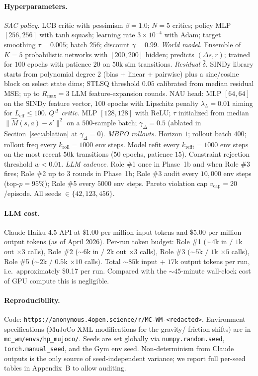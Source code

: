 \documentclass{article}
\theoremstyle{definition}
\newcommand{\QD}{Q^{\Delta}}
\begin{document}
\paragraph{Hyperparameters.}
\emph{SAC policy.}  LCB critic with pessimism $\beta=1.0$; $N=5$ critics;
policy MLP $[256,256]$ with tanh squash; learning rate $3\times 10^{-4}$
with Adam; target smoothing $\tau=0.005$; batch $256$; discount
$\gamma=0.99$.
\emph{World model.}  Ensemble of $K=5$ probabilistic networks with
$[200,200]$ hidden; predicts $(\Delta s, r)$; trained for $100$ epochs
with patience $20$ on $50$k sim transitions.
\emph{Residual $\hat\delta$.}  SINDy library starts from polynomial
degree $2$ (bias + linear + pairwise) plus a sine/cosine block on select
state dims; STLSQ threshold $0.05$ calibrated from median residual MSE;
up to $R_{\max}=3$ LLM feature-expansion rounds.  NAU head: MLP
$[64,64]$ on the SINDy feature vector, $100$ epochs with Lipschitz
penalty $\lambda_L=0.01$ aiming for $L_\mathrm{eff}\le 100$.
\emph{$\QD$ critic.}  MLP $[128,128]$ with ReLU; $\tau$ initialized from
median $\|\hat M(s,a)-s'\|^2$ on a $500$-sample batch; $\gamma_\Delta=0.5$
(ablated in Section~\ref{sec:ablation} at $\gamma_\Delta=0$).
\emph{MBPO rollouts.}  Horizon $1$; rollout batch $400$; rollout freq
every $k_{\mathrm{roll}}=1000$ env steps.  Model refit every
$k_{\mathrm{refit}}=1000$ env steps on the most recent $50$k
transitions ($50$ epochs, patience $15$).  Constraint rejection
threshold $w<0.01$.
\emph{LLM cadence.}  Role \#1 once in Phase~1b and when Role \#3 fires;
Role \#2 up to $3$ rounds in Phase~1b; Role \#3 audit every
$10{,}000$ env steps (top-$p=95$\%); Role \#5 every $5000$ env steps.
Pareto violation cap $v_{\mathrm{cap}}=20$/episode.
All seeds $\in\{42,123,456\}$.

\paragraph{LLM cost.}
Claude Haiku 4.5 API at $\$1.00$ per million input tokens and $\$5.00$
per million output tokens (as of April 2026).  Per-run token budget:
Role \#1 ($\sim 4$k in $/$ $1$k out $\times 3$ calls), Role \#2
($\sim 6$k in $/$ $2$k out $\times 3$ calls), Role \#3 ($\sim 5$k $/$
$1$k $\times 5$ calls), Role \#5 ($\sim 2$k $/$ $0.5$k $\times 10$
calls).  Total $\sim 85$k input + $17$k output tokens per run,
i.e.\ approximately \$0.17 per run.  Compared with the $\sim 45$-minute
wall-clock cost of GPU compute this is negligible.

\paragraph{Reproducibility.}
Code: \texttt{https://anonymous.4open.science/r/MC-WM-<redacted>}.
Environment specifications (MuJoCo XML modifications for the gravity/
friction shifts) are in \texttt{mc\_wm/envs/hp\_mujoco/}.
Seeds are set globally via \texttt{numpy.random.seed},
\texttt{torch.manual\_seed}, and the Gym env seed.  Non-determinism
from Claude outputs is the only source of seed-independent variance;
we report full per-seed tables in Appendix~B to allow auditing.
\end{document}
